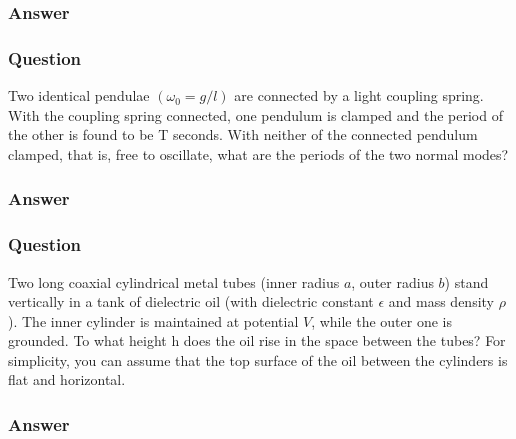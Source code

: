 \subsubsection{Answer}



\subsubsection{Question}
Two identical pendulae $(\omega_0 = g/l)$ are connected by a light coupling spring. With the coupling spring connected, one pendulum is clamped and the period of the other is found to be T seconds. With neither of the connected pendulum clamped, that is, free to oscillate, what are the periods of the two normal modes?
\subsubsection{Answer}



\subsubsection{Question}
Two long coaxial cylindrical metal tubes (inner radius $a$, outer radius $b$) stand vertically in a tank of dielectric oil (with dielectric constant $\epsilon$ and mass density $\rho$). The inner cylinder is maintained at potential $V$, while the outer one is grounded. To what height h does the oil rise in the space between the tubes? For simplicity, you can assume that the top surface of the oil between the cylinders is flat and horizontal.
\subsubsection{Answer}


